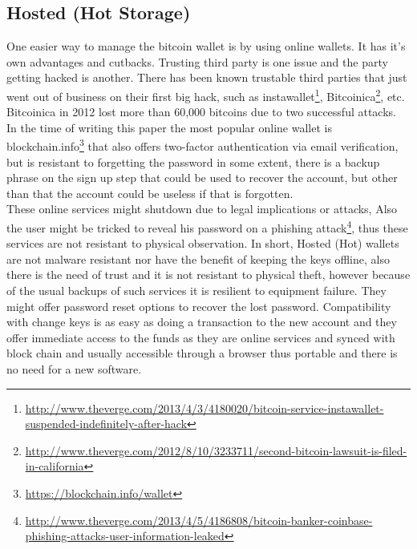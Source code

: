 \subsection{Hosted (Hot Storage)} 
One easier way to manage the bitcoin wallet is by using online wallets. It has it's own advantages and cutbacks. Trusting third party is one issue and the party getting hacked is another. There has been known trustable third parties that just went out of business on their first big hack, such as instawallet\footnote{\url{http://www.theverge.com/2013/4/3/4180020/bitcoin-service-instawallet-suspended-indefinitely-after-hack}}, Bitcoinica\footnote{\url{http://www.theverge.com/2012/8/10/3233711/second-bitcoin-lawsuit-is-filed-in-california}}, etc. Bitcoinica in 2012 lost more than 60,000 bitcoins due to two successful attacks.\\
In the time of writing this paper the most popular online wallet is blockchain.info\footnote{\url{https://blockchain.info/wallet}} that also offers two-factor authentication via email verification, but is resistant to forgetting the password in some extent, there is a backup phrase on the sign up step that could be used to recover the account, but other than that the account could be useless if that is forgotten.\\ These online services might shutdown due to legal implications or attacks, Also the user might be tricked to reveal his password on a phishing attack\footnote{\url{http://www.theverge.com/2013/4/5/4186808/bitcoin-banker-coinbase-phishing-attacks-user-information-leaked}}, thus these services are not resistant to physical observation.
In short, Hosted (Hot) wallets are not malware resistant nor have the benefit of keeping the keys offline, also there is the need of trust and it is not resistant to physical theft, however because of the usual backups of such services it is resilient to equipment failure. They might offer password reset options to recover the lost password. Compatibility with change keys is as easy as doing a transaction to the new account and they offer immediate access to the funds as they are online services and synced with block chain and usually accessible through a browser thus portable and there is no need for a new software.


